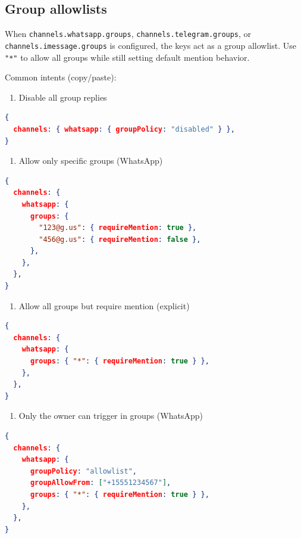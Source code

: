 \subsection{Group allowlists}


When \texttt{channels.whatsapp.groups}, \texttt{channels.telegram.groups}, or \texttt{channels.imessage.groups} is configured, the keys act as a group allowlist. Use \texttt{"*"} to allow all groups while still setting default mention behavior.

Common intents (copy/paste):

\begin{enumerate}
  \item Disable all group replies
\end{enumerate}


\begin{lstlisting}[language=json]
{
  channels: { whatsapp: { groupPolicy: "disabled" } },
}
\end{lstlisting}


\begin{enumerate}
  \item Allow only specific groups (WhatsApp)
\end{enumerate}


\begin{lstlisting}[language=json]
{
  channels: {
    whatsapp: {
      groups: {
        "123@g.us": { requireMention: true },
        "456@g.us": { requireMention: false },
      },
    },
  },
}
\end{lstlisting}


\begin{enumerate}
  \item Allow all groups but require mention (explicit)
\end{enumerate}


\begin{lstlisting}[language=json]
{
  channels: {
    whatsapp: {
      groups: { "*": { requireMention: true } },
    },
  },
}
\end{lstlisting}


\begin{enumerate}
  \item Only the owner can trigger in groups (WhatsApp)
\end{enumerate}


\begin{lstlisting}[language=json]
{
  channels: {
    whatsapp: {
      groupPolicy: "allowlist",
      groupAllowFrom: ["+15551234567"],
      groups: { "*": { requireMention: true } },
    },
  },
}
\end{lstlisting}


